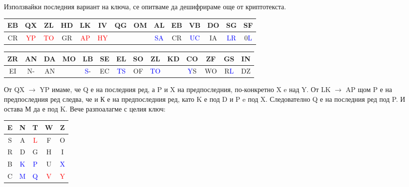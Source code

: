 \documentclass{article}
\begin{document}
\justify
Използвайки последния вариант на ключа, се опитваме да дешифрираме още от криптотекста.

\begin{center}
\begin{tabular}{|c|c|c|c|c|c|c|c|c|c|c|c|c|c|}
        \hline
        EB & QX & ZL & HD & LK & IV & QG & OM & AL & EB & VB & DO & SG & SF \\
        \hline
        CR & \textcolor{red}{YP} & \textcolor{red}{TO} & GR & \textcolor{red}{AP} & \textcolor{red}{HY} &  &  & \textcolor{blue}{SA} & CR & \textcolor{blue}{UC} & IA & \textcolor{blue}{LR} & 0\textcolor{blue}{L} \\
        \hline
        \end{tabular}
\end{center}

\begin{center}
\begin{tabular}{|c|c|c|c|c|c|c|c|c|c|c|c|c|c|}
        \hline
        ZR & AN & DA & MO & LB & SE & EL & SO & ZL & KD & CO & ZF & GS & IN \\
        \hline
        EI & N- & AN &  & \textcolor{blue}{S}- & EC & \textcolor{blue}{TS} & OF & \textcolor{blue}{TO} &  & \textcolor{blue}{Y}S & WO & R\textcolor{blue}{L} & DZ \\
        \hline
        \end{tabular}
\end{center}

\justify
От QX $\rightarrow$ YP имаме, че Q е на последния ред, а P и X на предпоследния, по-конкретно X e над Y. От LK $\rightarrow$ AP щом P е на предпоследния ред следва, че и К е на предпоследния ред, като K е под D и P e под X. Следователно Q е на последния ред под P. И остава М да е под K. Вече разпоалагме с целия ключ: 

\begin{center}
\begin{tabular}{|c|c|c|c|c|}
        \hline
        E & N & T & W & Z \\
        \hline
        S & A & \textcolor{red}{L} & F & O \\
        \hline
        R & D & G & H & I \\
        \hline
        B & \textcolor{blue}{K} & \textcolor{blue}{P} & U & \textcolor{blue}{X} \\
        \hline
        C & \textcolor{blue}{M} & \textcolor{blue}{Q} & \textcolor{red}{V} & \textcolor{red}{Y} \\
        \hline
        \end{tabular}
\end{center}
\end{document}
